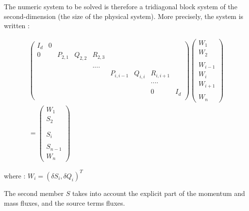 The numeric system to be solved is therefore a tridiagonal block system of the second-dimension (the size of the physical system). More precisely, the system is written :

\begin{eqnarray}
& \left(
         \begin{array}{ccccccccc}
          I_d & 0 & & & & & & & \\
          0 & & P_{2,1} & Q_{2,2} & R_{2,3} & & & & \\
             &   & & & & & & & \\
             & & & & .... & & & & \\
             & & & & & P_{i,i-1} & Q_{i,i} & R_{i,i+1} & \\
             & & & & & & & .... & \\
             & & & & & &  & &  \\
             & & & & & &  & 0 & I_d \\
         \end{array}
         \right)
\left(
            \begin{array}{c}
               W_1\\
               W_2\\
               \\
               W_{i-1} \\
               W_i \\
               W_{i+1} \\
               \\
               W_n
            \end{array}
          \right) & \nonumber \\
     & =
\left(
            \begin{array}{c}
               W_1\\
               S_2\\
               \\
                \\
               S_i \\
               \\
               S_{n-1}\\
               W_n
            \end{array}
          \right) &
\end{eqnarray}

where : $W_i = (\delta S_i , \delta Q_i )^T$

The second member $S$ takes into account the explicit part of the momentum and mass fluxes, and the source terms fluxes.

